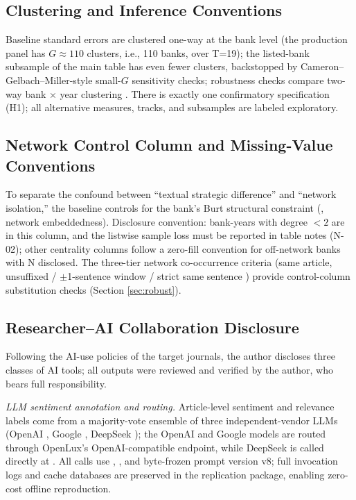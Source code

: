 \subsection{Clustering and Inference Conventions}\label{sec:method-cluster}
Baseline standard errors are clustered one-way at the bank level (the
production panel has $G\approx110$ clusters, i.e., 110 banks, over
T=19); the listed-bank subsample of the main table has even fewer
clusters, backstopped by Cameron--Gelbach--Miller-style small-$G$
sensitivity checks; robustness checks compare two-way bank $\times$
year clustering \parencite{cameron2015practitioner}. There is exactly one
confirmatory specification (H1); all alternative measures, tracks,
and subsamples are labeled exploratory.

\subsection{Network Control Column and Missing-Value Conventions}\label{sec:method-network}
To separate the confound between ``textual strategic difference'' and
``network isolation,'' the baseline controls for the bank's Burt
structural constraint (, network
embeddedness). Disclosure convention: bank-years with degree $<2$
are  in this column, and the listwise sample loss must be
reported in table notes (N-02); other centrality columns follow a
zero-fill convention for off-network banks with N disclosed. The
three-tier network co-occurrence criteria (same article, unsuffixed /
$\pm$1-sentence window  / strict same sentence
) provide control-column substitution checks
(Section \ref{sec:robust}).

\subsection{Researcher--AI Collaboration Disclosure}\label{sec:method-ai}
Following the AI-use policies of the target journals, the author
discloses three classes of AI tools; all outputs were reviewed and
verified by the author, who bears full responsibility.

\emph{LLM sentiment annotation and routing.} Article-level sentiment
and relevance labels come from a majority-vote ensemble of three
independent-vendor LLMs (OpenAI , Google
, DeepSeek );
the OpenAI and Google models are routed through OpenLux's
OpenAI-compatible endpoint, while DeepSeek is called directly at
. All calls use ,
, and byte-frozen prompt version v8; full invocation
logs and cache databases are preserved in the replication package,
enabling zero-cost offline reproduction.

